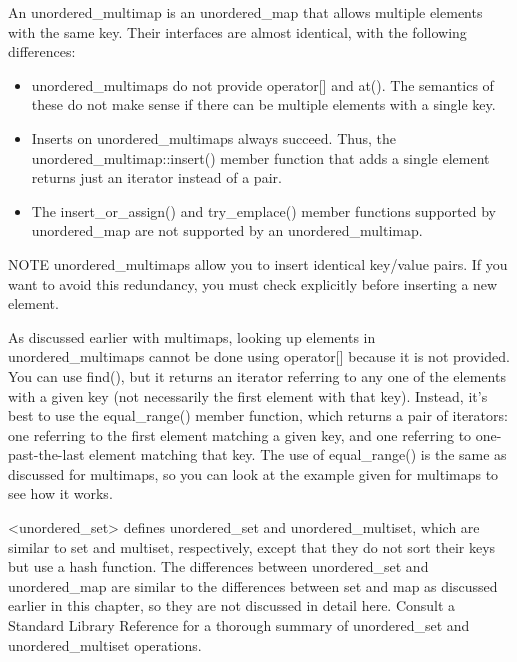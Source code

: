 
An unordered\_multimap is an unordered\_map that allows multiple elements with the same key. Their interfaces are almost identical, with the following differences:

\begin{itemize}
\item
unordered\_multimaps do not provide operator[] and at(). The semantics of these do not make sense if there can be multiple elements with a single key.

\item
Inserts on unordered\_multimaps always succeed. Thus, the unordered\_multimap::insert() member function that adds a single element returns just an iterator instead of a pair.

\item
The insert\_or\_assign() and try\_emplace() member functions supported by unordered\_map are not supported by an unordered\_multimap.
\end{itemize}

\begin{myNotic}{NOTE}
unordered\_multimaps allow you to insert identical key/value pairs. If you want to avoid this redundancy, you must check explicitly before inserting a new element.
\end{myNotic}

As discussed earlier with multimaps, looking up elements in unordered\_multimaps cannot be done using operator[] because it is not provided. You can use find(), but it returns an iterator referring to any one of the elements with a given key (not necessarily the first element with that key). Instead, it’s best to use the equal\_range() member function, which returns a pair of iterators: one referring to the first element matching a given key, and one referring to one-past-the-last element matching that key. The use of equal\_range() is the same as discussed for multimaps, so you can look at the example given for multimaps to see how it works.


<unordered\_set> defines unordered\_set and unordered\_multiset, which are similar to set and multiset, respectively, except that they do not sort their keys but use a hash function. The differences between unordered\_set and unordered\_map are similar to the differences between set and map as discussed earlier in this chapter, so they are not discussed in detail here. Consult a Standard Library Reference for a thorough summary of unordered\_set and unordered\_multiset operations.

